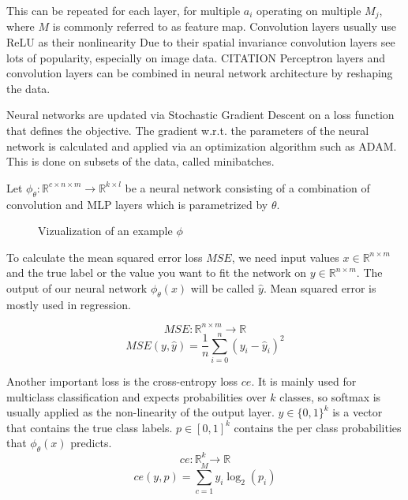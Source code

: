 \documentclass{article}
\begin{document}
\noindent This can be repeated for each layer, for multiple $a_i$ operating on multiple $M_j$, where $M$ is commonly
referred to as feature map. Convolution layers usually use ReLU as their nonlinearity
Due to their spatial invariance convolution layers see lots of popularity, especially on image data. CITATION
Perceptron layers and convolution layers can be combined in neural network architecture by reshaping the data.\newline

\noindent Neural networks are updated via Stochastic Gradient Descent on a loss function that defines the objective.
The gradient w.r.t. the parameters of the neural network is calculated and applied via an optimization algorithm such
as ADAM. This is done on subsets of the data, called minibatches.

\noindent Let $\phi_\theta: \mathbb{R}^{c \times n \times m} \xrightarrow{} \mathbb{R}^{k \times l}$ be a neural network consisting
of a combination of convolution and MLP layers which is parametrized by $\theta$. 

\begin{figure}[htbp]
  \centering
  
  \caption{Vizualization of an example $\phi$}
\end{figure}

\noindent To calculate the mean squared error loss $MSE$, 
we need input values  $x \in \mathbb{R}^{n\times m}$ and the true
label or the value you want to fit the network on $y \in \mathbb{R}^{n\times m}$.  
The output of our neural network $\phi_\theta(x)$ will be called $\hat{y}$. 
Mean squared error is mostly used in regression.

\begin{equation}
    MSE: \mathbb{R}^{n \times m} \xrightarrow{} \mathbb{R}
\end{equation}
\begin{equation*}
    MSE(y, \hat{y}) = \frac{1}{n} \sum_{i=0}^{n} (y_i-\hat{y}_i)^2
\end{equation*}

\noindent Another important loss is the cross-entropy loss $ce$. It is mainly used for multiclass classification and expects
probabilities over $k$ classes, so softmax is usually applied as the non-linearity of the output layer.
$y \in \{0, 1\}^{k}$ is a vector that contains the true class labels. $p \in [0, 1]^{k}$ contains
the per class probabilities that $\phi_\theta(x)$ predicts.
\begin{equation}
    ce: \mathbb{R}^{k} \xrightarrow{} \mathbb{R}
\end{equation}
\begin{equation*}
    ce(y, p) = \sum_{c=1}^My_{i}\log_2(p_{i})
\end{equation*}
\end{document}
